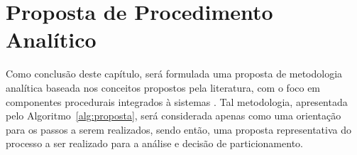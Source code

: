    \section{Proposta de Procedimento Analítico} \label{sec:proposta}

      Como conclusão deste capítulo, será formulada uma proposta de metodologia analítica baseada nos conceitos propostos pela literatura, com o foco em componentes procedurais integrados à sistemas \wearables.
      Tal metodologia, apresentada pelo Algoritmo~\ref{alg:proposta}, será considerada apenas como uma orientação para os passos a serem realizados, sendo então, uma proposta representativa do processo a ser realizado para a análise e decisão de particionamento.

